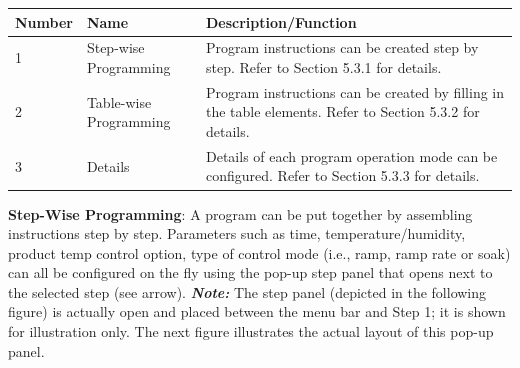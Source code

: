 \begin{longtable}[]{@{}lll@{}}
\toprule
\begin{minipage}[b]{0.04\columnwidth}\raggedright
Number\strut
\end{minipage} & \begin{minipage}[b]{0.23\columnwidth}\raggedright
Name\strut
\end{minipage} & \begin{minipage}[b]{0.65\columnwidth}\raggedright
Description/Function\strut
\end{minipage}\tabularnewline
\midrule
\endhead
\begin{minipage}[t]{0.04\columnwidth}\raggedright
1\strut
\end{minipage} & \begin{minipage}[t]{0.23\columnwidth}\raggedright
Step-wise Programming\strut
\end{minipage} & \begin{minipage}[t]{0.65\columnwidth}\raggedright
Program instructions can be created step by step. Refer to Section 5.3.1
for details.\strut
\end{minipage}\tabularnewline
\begin{minipage}[t]{0.04\columnwidth}\raggedright
2\strut
\end{minipage} & \begin{minipage}[t]{0.23\columnwidth}\raggedright
Table-wise Programming\strut
\end{minipage} & \begin{minipage}[t]{0.65\columnwidth}\raggedright
Program instructions can be created by filling in the table elements.
Refer to Section 5.3.2 for details.\strut
\end{minipage}\tabularnewline
\begin{minipage}[t]{0.04\columnwidth}\raggedright
3\strut
\end{minipage} & \begin{minipage}[t]{0.23\columnwidth}\raggedright
Details\strut
\end{minipage} & \begin{minipage}[t]{0.65\columnwidth}\raggedright
Details of each program operation mode can be configured. Refer to
Section 5.3.3 for details.\strut
\end{minipage}\tabularnewline
\bottomrule
\end{longtable}

\textbf{Step-Wise Programming}: A program can be put together by
assembling instructions step by step. Parameters such as time,
temperature/humidity, product temp control option, type of control mode
(i.e., ramp, ramp rate or soak) can all be configured on the fly using
the pop-up step panel that opens next to the selected step (see arrow).
\textbf{\emph{Note:}} The step panel (depicted in the following figure)
is actually open and placed between the menu bar and Step 1; it is shown
for illustration only. The next figure illustrates the actual layout of
this pop-up panel.

